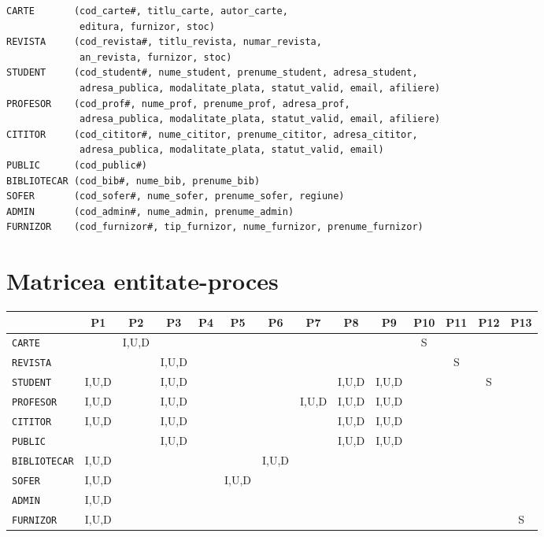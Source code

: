 \begin{verbatim}
CARTE       (cod_carte#, titlu_carte, autor_carte, 
             editura, furnizor, stoc)
REVISTA     (cod_revista#, titlu_revista, numar_revista, 
             an_revista, furnizor, stoc)
STUDENT     (cod_student#, nume_student, prenume_student, adresa_student,
             adresa_publica, modalitate_plata, statut_valid, email, afiliere)
PROFESOR    (cod_prof#, nume_prof, prenume_prof, adresa_prof,
             adresa_publica, modalitate_plata, statut_valid, email, afiliere)
CITITOR     (cod_cititor#, nume_cititor, prenume_cititor, adresa_cititor,
             adresa_publica, modalitate_plata, statut_valid, email)
PUBLIC      (cod_public#)
BIBLIOTECAR (cod_bib#, nume_bib, prenume_bib)
SOFER       (cod_sofer#, nume_sofer, prenume_sofer, regiune)
ADMIN       (cod_admin#, nume_admin, prenume_admin)
FURNIZOR    (cod_furnizor#, tip_furnizor, nume_furnizor, prenume_furnizor)
\end{verbatim}



\section{Matricea entitate-proces}
\label{sec:matr-ep}

\begin{center}
  \footnotesize
  \begin{tabular}{|l|c|c|c|c|c|c|c|c|c|c|c|c|c|}
    \hline
    & P1 & P2 & P3 & P4 & P5 & P6 & P7 & P8 & P9 & P10 & P11 & P12 & P13 \\
    \hline \hline
    \texttt{CARTE} & & I,U,D & & & & & & & & S & & & \\
    \hline
    \texttt{REVISTA} & & & I,U,D & & & & & & & & S & & \\
    \hline
    \texttt{STUDENT} & I,U,D & & I,U,D & & & & & I,U,D & I,U,D & & & S & \\
    \hline
    \texttt{PROFESOR} & I,U,D & & I,U,D & & & & I,U,D & I,U,D & I,U,D & & & & \\
    \hline
    \texttt{CITITOR} & I,U,D & & I,U,D & & & & & I,U,D & I,U,D & & & & \\
    \hline
    \texttt{PUBLIC} & & & I,U,D & & & & & I,U,D & I,U,D & & & & \\
    \hline
    \texttt{BIBLIOTECAR} & I,U,D & & & & & I,U,D & & & & & & & \\
    \hline
    \texttt{SOFER} & I,U,D & & & & I,U,D & & & & & & & & \\
    \hline
    \texttt{ADMIN} & I,U,D & & & & & & & & & & & & \\
    \hline
    \texttt{FURNIZOR} & I,U,D& & & & & & & & & & & & S \\
    \hline
  \end{tabular}
\end{center}

